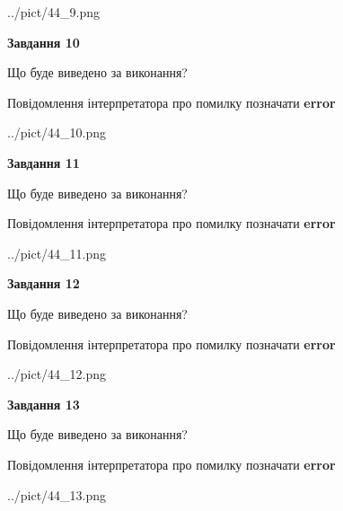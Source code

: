 \documentclass[11pt, ukrainian]{article}
\begin{document}
{\begin {large}
\begin{center}
	{../pict/44_9.png}
\end{center}
\newpage

{\begin {center}\textbf{Завдання 10}\end {center}}\par
Що буде виведено за виконання? \par
Повідомлення інтерпретатора про помилку позначати \textbf{error}

\begin{center}
	{../pict/44_10.png}
\end{center}
\newpage

{\begin {center}\textbf{Завдання 11}\end {center}}\par
Що буде виведено за виконання? \par
Повідомлення інтерпретатора про помилку позначати \textbf{error}

\begin{center}
	{../pict/44_11.png}
\end{center}
\newpage

{\begin {center}\textbf{Завдання 12}\end {center}}\par
Що буде виведено за виконання? \par
Повідомлення інтерпретатора про помилку позначати \textbf{error}

\begin{center}
	{../pict/44_12.png}
\end{center}
\newpage

{\begin {center}\textbf{Завдання 13}\end {center}}\par
Що буде виведено за виконання? \par
Повідомлення інтерпретатора про помилку позначати \textbf{error}

\begin{center}
	{../pict/44_13.png}
\end{center}
\newpage


\end{large}}
\end{document}
